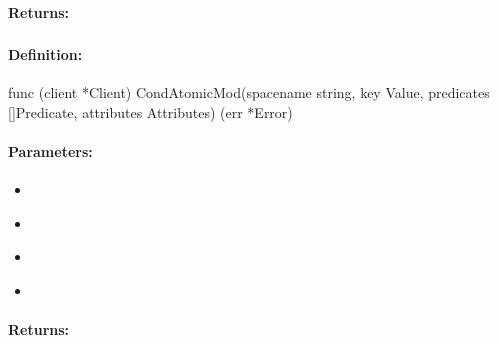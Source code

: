 \paragraph{Returns:}


\pagebreak
\subsubsection{}
\label{api:Go:CondAtomicMod}


\paragraph{Definition:}
\begin{gocode}
func (client *Client) CondAtomicMod(spacename string, key Value, predicates []Predicate, attributes Attributes) (err *Error)
\end{gocode}

\paragraph{Parameters:}
\begin{itemize}[noitemsep]
\item {}\\

\item {}\\

\item {}\\

\item {}\\

\end{itemize}

\paragraph{Returns:}


\pagebreak
\subsubsection{}
\label{api:Go:GroupAtomicMod}


